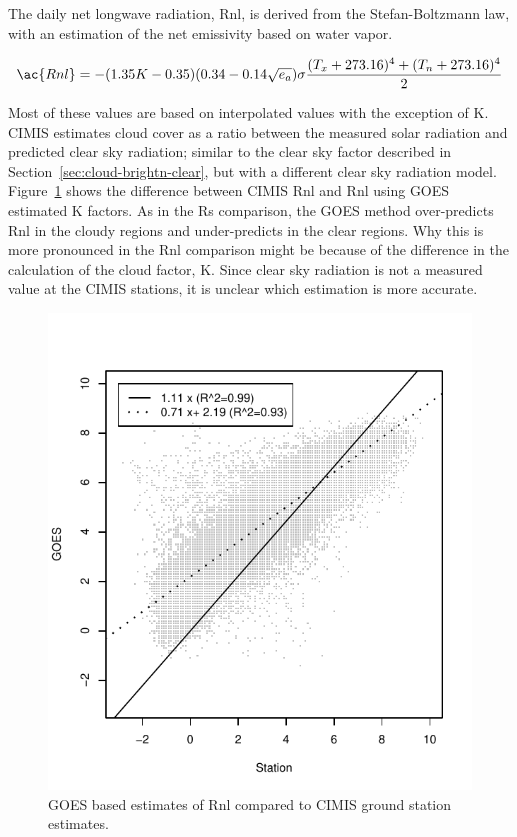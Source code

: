 \documentclass[reviewcopy]{elsart}
\begin{document}
The daily net longwave radiation, \ac{Rnl}, is derived from the
Stefan-Boltzmann law, with an estimation of the net emissivity based
on water vapor.

\begin{equation}
   \ac{Rnl} = -(1.35K-0.35)(0.34-0.14\sqrt{e_a})\sigma\frac{(T_x+273.16)^4+(T_n+273.16)^4}{2}
\end{equation}

Most of these values are based on interpolated values with the
exception of \ac{K}.  \ac{CIMIS} estimates cloud cover as a ratio
between the measured solar radiation and predicted clear sky
radiation; similar to the clear sky factor described in
Section~\ref{sec:cloud-brightn-clear}, but with a different clear sky
radiation model.  Figure~\ref{fig:Rlw} shows the difference between
\ac{CIMIS} \ac{Rnl} and \ac{Rnl} using \ac{GOES} estimated \ac{K}
factors.  As in the \ac{Rs} comparison, the \ac{GOES} method
over-predicts \ac{Rnl} in the cloudy regions and under-predicts in the
clear regions.  Why this is more pronounced in the \ac{Rnl} comparison
might be because of the difference in the calculation of the cloud
factor, \ac{K}.  Since clear sky radiation is not a measured value at
the \ac{CIMIS} stations, it is unclear which estimation is more
accurate.
        
\begin{figure}[htbp]
  \centering
  \includegraphics{Rnl_R.pdf}
  \caption{
%
    \ac{GOES} based estimates of \acl{Rnl} compared to \ac{CIMIS}
    ground station estimates.
%
  }
  \label{fig:Rlw}
\end{figure}
\end{document}
